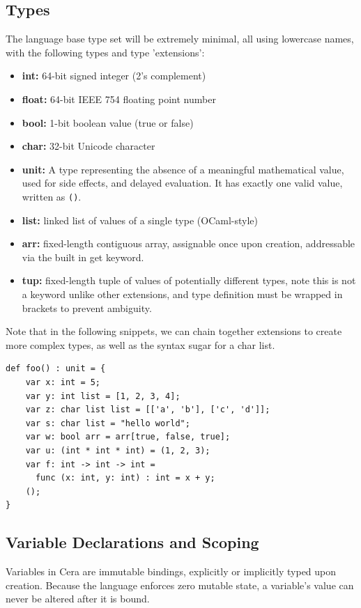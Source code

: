 \documentclass[11pt, a4paper]{article}
\begin{document}
\subsection{Types}
\noindent
The language base type set will be extremely minimal, all using lowercase names, with the following types and type 'extensions':
\begin{itemize}
    \item \textbf{int:} 64-bit signed integer (2's complement)
    \item \textbf{float:} 64-bit IEEE 754 floating point number
    \item \textbf{bool:} 1-bit boolean value (true or false)
    \item \textbf{char:} 32-bit Unicode character
    \item \textbf{unit:} A type representing the absence of a meaningful mathematical value, used for side effects, and delayed evaluation. It has exactly one valid value, written as \texttt{()}.
    \item \textbf{list:} linked list of values of a single type (OCaml-style)
    \item \textbf{arr:} fixed-length contiguous array, assignable once upon creation, addressable via the built in get keyword.
    \item \textbf{tup:} fixed-length tuple of values of potentially different types, note this is not a keyword unlike other extensions, and type definition must be wrapped in brackets to prevent ambiguity.
\end{itemize}
Note that in the following snippets, we can chain together extensions to create more complex types, as well as the syntax sugar for a char list.

\begin{lstlisting}[language=Cera, title={Cera Language}, basicstyle=\ttfamily]
def foo() : unit = {
    var x: int = 5;
    var y: int list = [1, 2, 3, 4];
    var z: char list list = [['a', 'b'], ['c', 'd']];
    var s: char list = "hello world";
    var w: bool arr = arr[true, false, true];
    var u: (int * int * int) = (1, 2, 3);
    var f: int -> int -> int = 
      func (x: int, y: int) : int = x + y;
    ();
}
\end{lstlisting}

\subsection{Variable Declarations and Scoping}
\noindent
Variables in Cera are immutable bindings, explicitly or implicitly typed upon creation. Because the language enforces zero mutable state, a variable's value can never be altered after it is bound.
\end{document}
